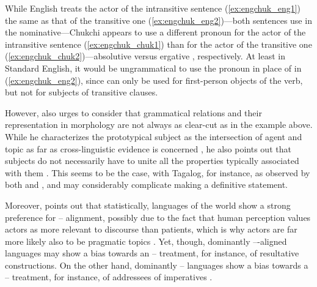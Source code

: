 While English treats the actor of the intransitive sentence
(\ref{ex:engchuk_eng1}) the same as that of the transitive one
(\ref{ex:engchuk_eng2})---both sentences use  in the nominative---Chukchi
appears to use a different pronoun for the actor of the intransitive sentence
(\ref{ex:engchuk_chuk1}) than for the actor of the transitive one
(\ref{ex:engchuk_chuk2})---absolutive  versus ergative ,
respectively. At least in Standard English, it would be ungrammatical to use
the pronoun  in place of  in (\ref{ex:engchuk_eng2}), since
 can only be used for first-person objects of the verb, but not for
subjects of transitive clauses.

However, \citet{comrie1989} also urges to consider that grammatical relations
and their representation in morphology are not always as clear-cut as in the
example above. While he characterizes the prototypical subject as the
intersection of agent and topic as far as cross-linguistic evidence is
concerned \citep[107]{comrie1989}, he also points out that subjects do not
necessarily have to unite all the properties typically associated with them
\citep[110]{comrie1989}. This seems to be the case, with Tagalog, for instance,
as observed by both \citet{schachter1976} and \citet{kroeger1991}, and may
considerably complicate making a definitive statement.

Moreover, \citet{comrie1989} points out that statistically, languages of the
world show a strong preference for \Nom{}--\Acc{} alignment, possibly due to
the fact that human perception values actors as more relevant to discourse than
patients, which is why actors are far more likely also to be pragmatic topics
\citep[120]{comrie1989}. Yet, though, dominantly \Nom{}--\Acc{}-aligned
languages may show a bias towards an \Erg{}--\Abs{} treatment, for instance, of
resultative constructions. On the other hand, dominantly \Erg{}--\Abs{}
languages show a bias towards a \Nom{}--\Acc{} treatment, for instance, of
addressees of imperatives \citep[116--119]{comrie1989}.

